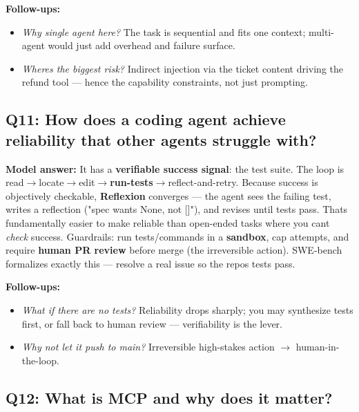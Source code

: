\documentclass[11pt]{article}
\providecommand{\tightlist}{\setlength{\itemsep}{1pt}\setlength{\parskip}{0pt}}
\begin{document}
\textbf{Follow-ups:}

\begin{itemize}
\tightlist
\item
  \emph{Why single agent here?} The task is sequential and fits one context; multi-agent would just add overhead and failure surface.
\item
  \emph{Where\textquotesingle s the biggest risk?} Indirect injection via the ticket content driving the refund tool --- hence the capability constraints, not just prompting.
\end{itemize}

\subsection{Q11: How does a coding agent achieve reliability that other agents struggle with?}\label{q11-how-does-a-coding-agent-achieve-reliability-that-other-agents-struggle-with}

\textbf{Model answer:} It has a \textbf{verifiable success signal}: the test suite. The loop is read\(\rightarrow\)locate\(\rightarrow\)edit\(\rightarrow\)\textbf{run-tests}\(\rightarrow\)reflect-and-retry. Because success is objectively checkable, \textbf{Reflexion} converges --- the agent sees the failing test, writes a reflection ("spec wants None, not {[}{]}"), and revises until tests pass. That\textquotesingle s fundamentally easier to make reliable than open-ended tasks where you can\textquotesingle t \emph{check} success. Guardrails: run tests/commands in a \textbf{sandbox}, cap attempts, and require \textbf{human PR review} before merge (the irreversible action). SWE-bench formalizes exactly this --- resolve a real issue so the repo\textquotesingle s tests pass.

\textbf{Follow-ups:}

\begin{itemize}
\tightlist
\item
  \emph{What if there are no tests?} Reliability drops sharply; you may synthesize tests first, or fall back to human review --- verifiability is the lever.
\item
  \emph{Why not let it push to main?} Irreversible high-stakes action \(\rightarrow\) human-in-the-loop.
\end{itemize}

\subsection{Q12: What is MCP and why does it matter?}\label{q12-what-is-mcp-and-why-does-it-matter}
\end{document}
